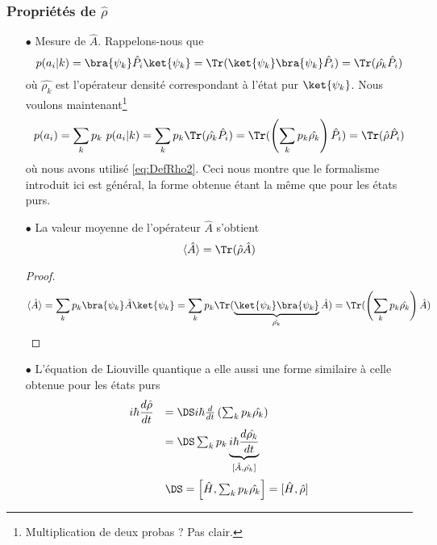 \subsubsection{Propriétés de $\hat{\rho}$}
\begin{itemize}
\item[$\bullet$] Mesure de $\hat{A}$. Rappelons-nous que
\begin{equation}
p(a_i|k) = \bra{\psi_k}\hat{P_i}\ket{\psi_k} = \Tr(\ket{\psi_k}\bra{\psi_k}\hat{P_i}) = \Tr(\hat{\rho_k}\hat{P_i})
\end{equation}
où $\hat{\rho_k}$ est l'opérateur densité correspondant à l'état pur $\ket{\psi_k}$. Nous voulons maintenant\footnote{Multiplication de deux probas ? Pas clair.}
\begin{equation}
p(a_i) = \sum_k p_k\ p(a_i|k) = \sum_k p_k \Tr(\hat{\rho_k}\hat{P_i}) = \Tr(\left(\sum_k p_k\hat{\rho_k}\right)\hat{P_i}) = 
\Tr(\hat{\rho}\hat{P_i})
\end{equation}
où nous avons utilisé \eqref{eq:DefRho2}. Ceci nous montre que le formalisme introduit ici est général, la forme 
obtenue étant la même que pour les états purs.\\

\item[$\bullet$] La valeur moyenne de l'opérateur $\hat{A}$ s'obtient
\begin{equation}
\langle\hat{A}\rangle = \Tr(\hat{\rho}\hat{A})
\end{equation}
\begin{proof}
\begin{equation}
\langle\hat{A}\rangle = \sum_k p_k \bra{\psi_k}\hat{A}\ket{\psi_k} = \sum_k p_k\Tr(\underbrace{\ket{\psi_k}\bra{\psi_k}}_{\hat{\rho_k}}\hat{A}) = \Tr(\left(\sum_k p_k\hat{\rho_k}\right)\hat{A})
\end{equation}
\end{proof}

\item[$\bullet$] L'équation de Liouville quantique a elle aussi une forme similaire à celle obtenue pour les états purs
\begin{equation}
\begin{array}{ll}
i\hbar\dfrac{d\hat{\rho}}{dt} &=\DS i\hbar\frac{d}{dt}\left(\sum_k p_k \hat{\rho_k}\right)\vspace{2mm}\\
&=\DS  \sum_k p_k \underbrace{i\hbar \frac{d\hat{\rho_k}}{dt}}_{[\hat{A},\hat{\rho_k}]}\vspace{2mm} \\
&\DS= \left[\hat H, \sum_k p_k\hat{\rho_k}\right] = [\hat{H},\hat{\rho}]
\end{array}
\end{equation}
\end{itemize}
